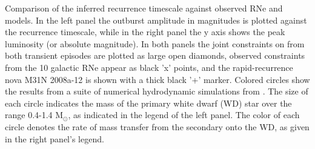 \label{fig:RecurrentNovaRecurrenceComparison}
Comparison of the inferred \spock recurrence timescale against
observed RNe and models.  In the left panel the outburst amplitude in
magnitudes is plotted against the recurrence timescale, while in the
right panel the y axis shows the peak luminosity (or absolute
magnitude).  In both panels the joint constraints on \spock from both
transient episodes are plotted as large open diamonds, observed
constraints from the 10 galactic RNe appear as black 'x' points, and
the rapid-recurrence nova M31N 2008a-12 is shown with a thick black
'+' marker.  Colored circles show the results from a suite of
numerical hydrodynamic simulations from \citep{Yaron:2005}.  The size
of each circle indicates the mass of the primary white dwarf (WD) star
over the range 0.4-1.4 M$_\odot$, as indicated in the legend of the
left panel.  The color of each circle denotes the rate of mass
transfer from the secondary onto the WD, as given in the right panel's
legend.

  
